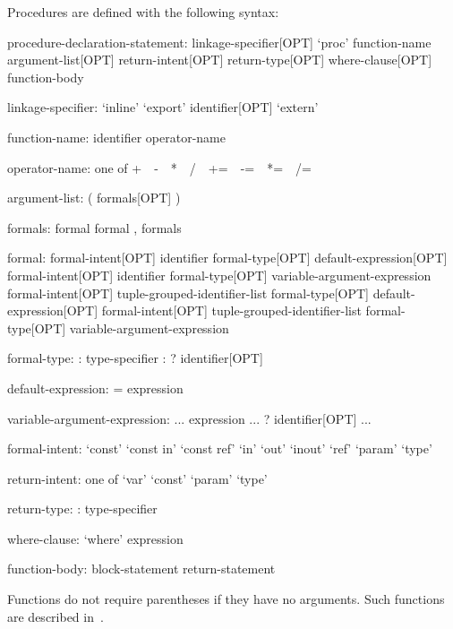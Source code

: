 Procedures are defined with the following syntax:
\begin{syntax}
procedure-declaration-statement:
  linkage-specifier[OPT] `proc' function-name argument-list[OPT] return-intent[OPT] return-type[OPT] where-clause[OPT]
    function-body

linkage-specifier:
  `inline'
  `export' identifier[OPT]
  `extern'

function-name:
  identifier
  operator-name

operator-name: one of
  + $ $ $ $ - $ $ $ $ * $ $ $ $ / $ $ $ $ %
  += $ $ $ $ -= $ $ $ $ *= $ $ $ $ /= $ $ $ $ %

argument-list:
  ( formals[OPT] )

formals:
  formal
  formal , formals

formal:
  formal-intent[OPT] identifier formal-type[OPT] default-expression[OPT]
  formal-intent[OPT] identifier formal-type[OPT] variable-argument-expression
  formal-intent[OPT] tuple-grouped-identifier-list formal-type[OPT] default-expression[OPT]
  formal-intent[OPT] tuple-grouped-identifier-list formal-type[OPT] variable-argument-expression

formal-type:
  : type-specifier
  : ? identifier[OPT]

default-expression:
  = expression

variable-argument-expression:
  ... expression
  ... ? identifier[OPT]
  ...

formal-intent:
  `const'
  `const in'
  `const ref'
  `in'
  `out'
  `inout'
  `ref'
  `param'
  `type'

return-intent: one of
  `var' `const' `param' `type'

return-type:
  : type-specifier

where-clause:
  `where' expression

function-body:
  block-statement
  return-statement
\end{syntax}


Functions do not require parentheses if they have no arguments.  Such
functions are described in~.

